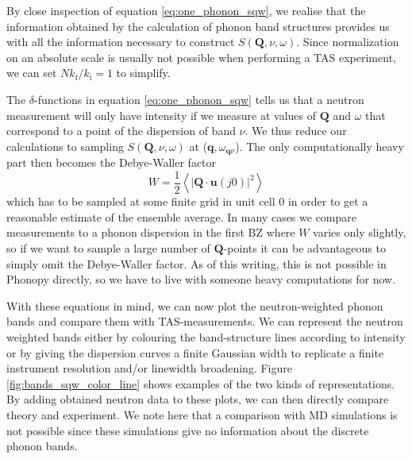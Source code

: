 By close inspection of equation \eqref{eq:one_phonon_sqw}, we realise that the information obtained by the calculation of phonon band structures provides us with all the information necessary to construct $S(\bm{Q},\nu,\omega)$. Since normalization on an absolute scale is usually not possible when performing a TAS experiment, we can set $N k_\text{f} / k_\text{i} = 1$ to simplify.

The $\delta$-functions in equation \eqref{eq:one_phonon_sqw} tells us that a neutron measurement will only have intensity if we measure at values of $\bm{Q}$ and $\omega$ that correspond to a point of the dispersion of band $\nu$. We thus reduce our calculations to sampling $S(\bm{Q},\nu,\omega)$ at ($\bm{q},\omega_{\bm{q}\nu}$). The only computationally heavy part then becomes the Debye-Waller factor
%
\[ W = \frac{1}{2} \left\langle | \bm{Q} \cdot \bm{u}(j0) |^2 \right\rangle \]
%
which has to be sampled at some finite grid in unit cell 0 in order to get a reasonable estimate of the ensemble average. In many cases we compare measurements to a phonon dispersion in the first BZ where $W$ varies only slightly, so if we want to sample a large number of $\bm{Q}$-points it can be advantageous to simply omit the Debye-Waller factor. As of this writing, this is not possible in Phonopy directly, so we have to live with someone heavy computations for now.

With these equations in mind, we can now plot the neutron-weighted phonon bands and compare them with TAS-measurements. We can represent the neutron weighted bands either by colouring the band-structure lines according to intensity or by giving the dispersion curves a finite Gaussian width to replicate a finite instrument resolution and/or linewidth broadening. Figure \ref{fig:bands_sqw_color_line} shows examples of the two kinds of representations. By adding obtained neutron data to these plots, we can then directly compare theory and experiment. We note here that a comparison with MD simulations is not possible since these simulations give no information about the discrete phonon bands.

